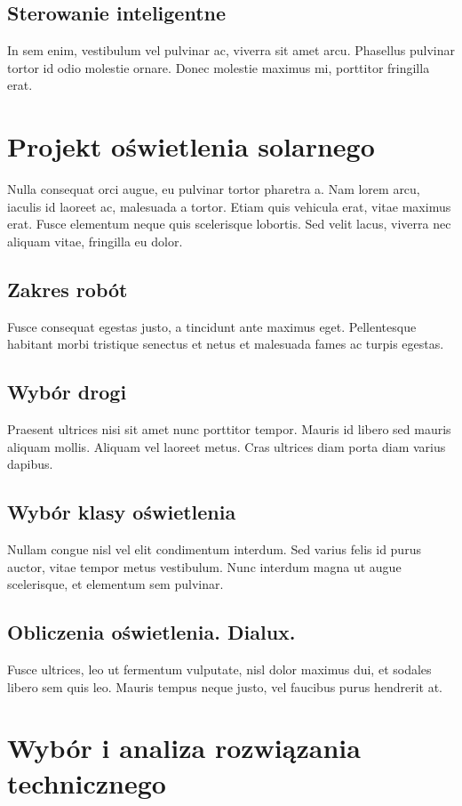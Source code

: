 \documentclass[skorowidz,xodstep,magisterska]{dyplomWIZUTMJ}
\begin{document}
	\section{Sterowanie inteligentne}
	In sem enim, vestibulum vel pulvinar ac, viverra sit amet arcu. Phasellus pulvinar tortor id odio molestie ornare. Donec molestie maximus mi, porttitor fringilla erat. 


\chapter{Projekt oświetlenia solarnego\label{chap:ProjektOswietleniaSolarnego}}

Nulla consequat orci augue, eu pulvinar tortor pharetra a. Nam lorem arcu, iaculis id laoreet ac, malesuada a tortor. Etiam quis vehicula erat, vitae maximus erat. Fusce elementum neque quis scelerisque lobortis. Sed velit lacus, viverra nec aliquam vitae, fringilla eu dolor.


	\section{Zakres robót}Fusce consequat egestas justo, a tincidunt ante maximus eget. Pellentesque habitant morbi tristique senectus et netus et malesuada fames ac turpis egestas.
	\section{Wybór drogi} Praesent ultrices nisi sit amet nunc porttitor tempor. Mauris id libero sed mauris aliquam mollis. Aliquam vel laoreet metus. Cras ultrices diam porta diam varius dapibus.
	\section{Wybór klasy oświetlenia\label{chap:WyborKlasyOswietleniowej}}
			Nullam congue nisl vel elit condimentum interdum. Sed varius felis id purus auctor, vitae tempor metus vestibulum. Nunc interdum magna ut augue scelerisque, et elementum sem pulvinar.
	\section{Obliczenia oświetlenia. Dialux.}
		Fusce ultrices, leo ut fermentum vulputate, nisl dolor maximus dui, et sodales libero sem quis leo. Mauris tempus neque justo, vel faucibus purus hendrerit at. 
		

\chapter{Wybór i analiza rozwiązania technicznego\label{chap:WyborIAnalizaRozwiazania}}
\end{document}
